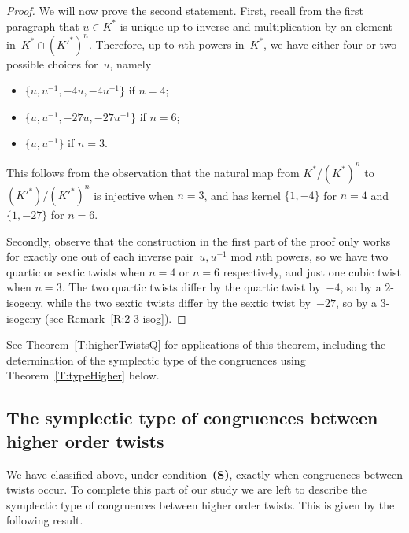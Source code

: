 \documentclass[twoside,leqno,symbols-for-thanks, draft]{rmi}
\numberwithin{equation}{section}
\theoremstyle{remark}
\begin{document}
\begin{proof}
We will now prove the second statement. First, recall from the first paragraph that $u \in K^*$ is unique up to inverse and
multiplication by an element
in~$K^*\cap(K'^*)^n$. Therefore, up to $n$th powers in~$K^*$,  
we have either four or two
possible choices for~$u$, namely
\begin{itemize}
  \item $\{u, u^{-1}, -4u, -4u^{-1}\}$ if $n=4$;
  \item $\{u, u^{-1}, -27u, -27u^{-1}\}$ if $n=6$;
  \item $\{u, u^{-1}\}$ if $n=3$.
\end{itemize}

This follows from the observation that the natural map from
$K^*/(K^*)^n$ to $(K'^*)/(K'^*)^n$ is injective when $n=3$, and has
kernel $\{1,-4\}$ for $n=4$ and $\{1,-27\}$ for $n=6$.

Secondly, observe that the construction in the first part of the proof
only works for exactly one out of each inverse pair~$u,u^{-1}$ mod
$n$th powers, so we have two quartic or sextic twists when $n=4$ or
$n=6$ respectively, and just one cubic twist when $n=3$.  The two
quartic twists differ by the quartic twist by~$-4$, so by a
$2$-isogeny, while the two sextic twists differ by the sextic twist
by~$-27$, so by a $3$-isogeny (see Remark~\ref{R:2-3-isog}).
\end{proof}

See Theorem~\ref{T:higherTwistsQ} for applications of this theorem,
including the determination of the symplectic type of the congruences
using Theorem~\ref{T:typeHigher} below.


\subsection{The symplectic type of congruences between higher order twists}
\label{SS:typeHigher}
We have classified above, under condition~{\bf (S)}, exactly when congruences between twists occur. To complete this part of our study we are left to describe the symplectic type of congruences between higher order twists. 
This is given by the following result. 
\end{document}
